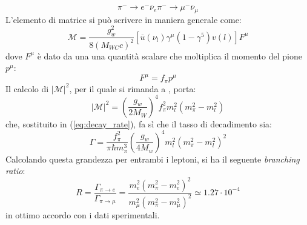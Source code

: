 \documentclass{subnucbo}
\begin{document}
\begin{subequations}
        \begin{equation}
                \pi^{-} \rightarrow e^{-} \overline{\nu}_{e}
                \label{eq:pi_e}
        \end{equation}
        \begin{equation}
                \pi^{-} \rightarrow \mu^{-} \overline{\nu}_{\mu}
                \label{eq:pi_mu}
        \end{equation}
\end{subequations}
L'elemento di matrice si può scrivere in maniera generale come:
\begin{equation}
        \mathcal { M } = \frac { g _ { w } ^ { 2 } } { 8 \left( M _ { W C } c \right) ^ { 2 } } \left[ \overline { u } ( \nu_{l} ) \gamma^{ \mu } \left( 1 - \gamma ^ { 5 } \right) v ( l ) \right] F ^ { \mu }
        \label{eq:matrix_element_pion_decay}
\end{equation}
dove $F^{\mu}$ è dato da una una quantità scalare che moltiplica il momento del pione $p^{\mu}$:
\begin{equation}
        F ^ { \mu } = f _ { \pi } p ^ { \mu }
\end{equation}
Il calcolo di $|\mathcal{M}|^{2}$, per il quale si rimanda a \cite{ref:griff}, porta:
\begin{equation}
         | \mathcal { M } | ^ { 2 }  = \left( \frac { g _ { w } } { 2 M _ { W } } \right) ^ { 4 } f _ { \pi } ^ { 2 } m _ { l } ^ { 2 } \left( m _ { \pi } ^ { 2 } - m _ { l } ^ { 2 } \right)
\end{equation}
che, sostituito in (\ref{eq:decay_rate}), fa sì che il tasso di decadimento sia:
\begin{equation}
        \Gamma = \frac { f _ { \pi } ^ { 2 } } { \pi \hbar m _ { \pi } ^ { 3 } } \left( \frac { g _ { w } } { 4 M _ { w } } \right) ^ { 4 } m _ { l } ^ { 2 } \left( m _ { \pi } ^ { 2 } - m _ { l } ^ { 2 } \right) ^ { 2 }
        \label{eq:decay_rate_pion}
\end{equation}
Calcolando questa grandezza per entrambi i leptoni, si ha il seguente \textit{branching ratio}:
\begin{equation}
        R = \frac { \Gamma _ { \pi \rightarrow e } } { \Gamma _ { \pi \rightarrow \mu } } = \frac { m _ { e } ^ { 2 } \left( m_{\pi}^{2} - m_{e}^2  \right) ^ { 2 } } { m _ { \mu } ^ { 2 } \left( m_{\pi}^2 - m_{\mu}^2 \right) ^ { 2 } } \simeq  1.27 \cdot 10 ^ { - 4 }
        \label{eq:br_ratio}
\end{equation}
in ottimo accordo con i dati sperimentali.
\end{document}
